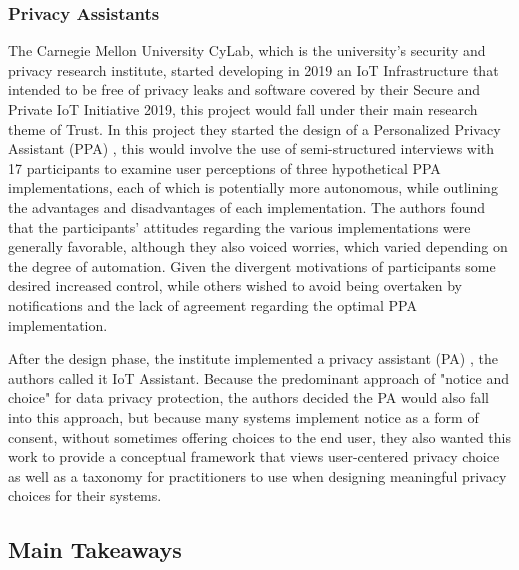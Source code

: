 \documentclass[manuscript,natbib=false]{acmart}
\begin{document}
\subsubsection{Privacy Assistants}

The Carnegie Mellon University CyLab, which is the university's security
and privacy research institute, started developing in 2019 an IoT Infrastructure
that intended to be free of privacy leaks and software covered by their
Secure and Private IoT Initiative 2019, this project would fall under
their main research theme of Trust. In this project they started the design
of a Personalized Privacy Assistant (PPA) \cite{ColnagoInforming}, this
would involve the use of semi-structured interviews with 17 participants
to examine user perceptions of three hypothetical PPA implementations,
each of which is potentially more autonomous, while outlining the advantages
and disadvantages of each implementation.
The authors found that the participants'
attitudes regarding the various implementations were generally favorable,
although they also voiced worries, which varied depending on the degree
of automation. Given the divergent motivations of participants some desired
increased control, while others wished to avoid being overtaken by notifications
and the lack of agreement regarding the optimal PPA implementation.

After the design phase, the institute implemented a privacy assistant (PA) \cite{FengDesign},
the authors called it IoT Assistant. Because the predominant approach of
"notice and choice" for data privacy protection, the authors decided the PA would
also fall into this approach, but because many systems implement notice
as a form of consent, without sometimes offering choices to the end user,
they also wanted this work to provide a conceptual framework that views
user-centered privacy choice as well as a taxonomy for practitioners to
use when designing meaningful privacy choices for their systems.

\subsection{Main Takeaways}
\end{document}
